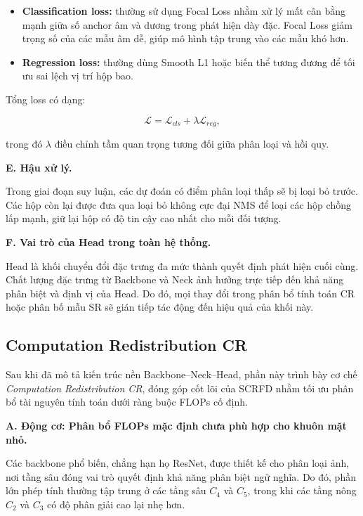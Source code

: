 \begin{itemize}
  \item \textbf{Classification loss:} thường sử dụng Focal Loss nhằm xử lý mất cân bằng mạnh giữa số anchor âm và dương trong phát hiện dày đặc. 
  Focal Loss giảm trọng số của các mẫu âm dễ, giúp mô hình tập trung vào các mẫu khó hơn. \cite{lin2017focal}
  \item \textbf{Regression loss:} thường dùng Smooth L1 hoặc biến thể tương đương để tối ưu sai lệch vị trí hộp bao.
\end{itemize}

Tổng loss có dạng:

\[
\mathcal{L} = \mathcal{L}_{cls} + \lambda \mathcal{L}_{reg},
\]

trong đó $\lambda$ điều chỉnh tầm quan trọng tương đối giữa phân loại và hồi quy.

\medskip
\noindent\textbf{E. Hậu xử lý.}

Trong giai đoạn suy luận, các dự đoán có điểm phân loại thấp sẽ bị loại bỏ trước. 
Các hộp còn lại được đưa qua loại bỏ không cực đại NMS để loại các hộp chồng lấp mạnh, giữ lại hộp có độ tin cậy cao nhất cho mỗi đối tượng.

\medskip
\noindent\textbf{F. Vai trò của Head trong toàn hệ thống.}

Head là khối chuyển đổi đặc trưng đa mức thành quyết định phát hiện cuối cùng. 
Chất lượng đặc trưng từ Backbone và Neck ảnh hưởng trực tiếp đến khả năng phân biệt và định vị của Head. 
Do đó, mọi thay đổi trong phân bổ tính toán CR hoặc phân bố mẫu SR sẽ gián tiếp tác động đến hiệu quả của khối này.

\subsection{Computation Redistribution CR}

Sau khi đã mô tả kiến trúc nền Backbone--Neck--Head, phần này trình bày cơ chế \textit{Computation Redistribution CR}, đóng góp cốt lõi của SCRFD nhằm tối ưu phân bổ tài nguyên tính toán dưới ràng buộc FLOPs cố định. \cite{guo2022scrfd}

\medskip
\noindent\textbf{A. Động cơ: Phân bổ FLOPs mặc định chưa phù hợp cho khuôn mặt nhỏ.}

Các backbone phổ biến, chẳng hạn họ ResNet, được thiết kế cho phân loại ảnh, nơi tầng sâu đóng vai trò quyết định khả năng phân biệt ngữ nghĩa. 
Do đó, phần lớn phép tính thường tập trung ở các tầng sâu $C_4$ và $C_5$, trong khi các tầng nông $C_2$ và $C_3$ có độ phân giải cao lại nhẹ hơn.

